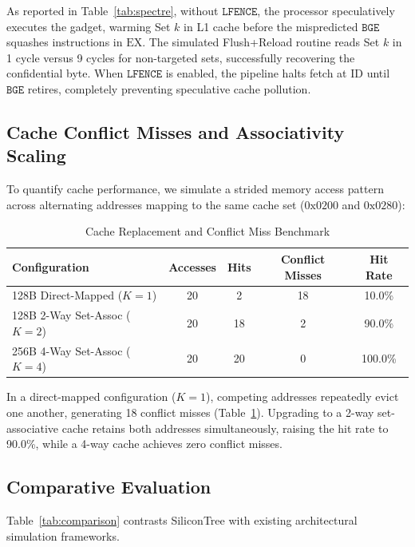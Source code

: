 \documentclass[journal,twocolumn,10pt]{IEEEtran}
\begin{document}
As reported in Table~\ref{tab:spectre}, without $\texttt{LFENCE}$, the processor speculatively executes the gadget, warming Set $k$ in L1 cache before the mispredicted $\texttt{BGE}$ squashes instructions in $\text{EX}$. The simulated Flush+Reload routine reads Set $k$ in 1 cycle versus 9 cycles for non-targeted sets, successfully recovering the confidential byte. When $\texttt{LFENCE}$ is enabled, the pipeline halts fetch at $\text{ID}$ until $\texttt{BGE}$ retires, completely preventing speculative cache pollution.

\subsection{Cache Conflict Misses and Associativity Scaling}
To quantify cache performance, we simulate a strided memory access pattern across alternating addresses mapping to the same cache set ($0\text{x}0200$ and $0\text{x}0280$):

\begin{table}[t]
\caption{Cache Replacement and Conflict Miss Benchmark}
\label{tab:cache}
\centering
\begin{tabular}{lcccc}
\toprule
\textbf{Configuration} & \textbf{Accesses} & \textbf{Hits} & \textbf{Conflict Misses} & \textbf{Hit Rate} \\
\midrule
128B Direct-Mapped ($K=1$) & 20 & 2 & 18 & 10.0\% \\
128B 2-Way Set-Assoc ($K=2$) & 20 & 18 & 2 & 90.0\% \\
256B 4-Way Set-Assoc ($K=4$) & 20 & 20 & 0 & 100.0\% \\
\bottomrule
\end{tabular}
\end{table}

In a direct-mapped configuration ($K=1$), competing addresses repeatedly evict one another, generating 18 conflict misses (Table~\ref{tab:cache}). Upgrading to a 2-way set-associative cache retains both addresses simultaneously, raising the hit rate to 90.0\%, while a 4-way cache achieves zero conflict misses.

\subsection{Comparative Evaluation}
Table~\ref{tab:comparison} contrasts SiliconTree with existing architectural simulation frameworks.
\end{document}
